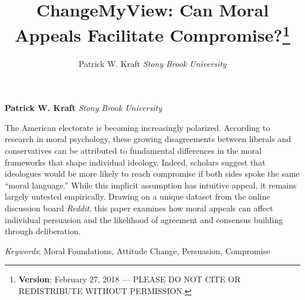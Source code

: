 \documentclass[12pt,]{article}
\title{ChangeMyView: Can Moral Appeals Facilitate Compromise?\thanks{\textbf{Version}: February 27, 2018 --- PLEASE DO NOT CITE OR
REDISTRIBUTE WITHOUT PERMISSION.}  }
\author{\Large Patrick W. Kraft\vspace{0.05in} \newline\normalsize\emph{Stony Brook University}  }
\date{}
\newcommand*{\authorfont}{\fontfamily{phv}\selectfont}
\renewenvironment{abstract}
 {{%
    \setlength{\leftmargin}{0mm}
    \setlength{\rightmargin}{\leftmargin}%
  }%
  \relax}
 {\endlist}
\begin{document}
	
%

{%
\setlength{\parindent}{0pt}
\thispagestyle{plain}
{\fontsize{18}{20}\selectfont\raggedright 
\maketitle  %

}

{
   \vskip 13.5pt\relax \normalsize\fontsize{11}{12} 
\textbf{\authorfont Patrick W. Kraft} \hskip 15pt \emph{\small Stony Brook University}   

}

}








\begin{abstract}

    \hbox{\vrule height .2pt width 39.14pc}

    \vskip 8.5pt %

\noindent The American electorate is becoming increasingly polarized. According to
research in moral psychology, these growing disagreements between
liberals and conservatives can be attributed to fundamental differences
in the moral frameworks that shape individual ideology. Indeed, scholars
suggest that ideologues would be more likely to reach compromise if both
sides spoke the same ``moral language.'' While this implicit assumption
has intuitive appeal, it remains largely untested empirically. Drawing
on a unique dataset from the online discussion board \emph{Reddit}, this
paper examines how moral appeals can affect individual persuasion and
the likelihood of agreement and consensus building through deliberation.


\vskip 8.5pt \noindent \emph{Keywords}: Moral Foundations, Attitude Change, Persuasion, Compromise \par

    \hbox{\vrule height .2pt width 39.14pc}



\end{abstract}


\vskip 6.5pt
\end{document}
